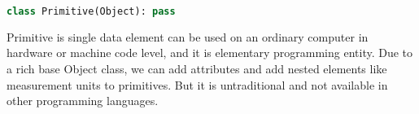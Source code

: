 \secdown

\begin{lstlisting}[language=Python]
class Primitive(Object): pass
\end{lstlisting}

\noindent
Primitive is single data element can be used on an ordinary computer in hardware
or machine code level, and it is elementary programming entity. Due to a rich
base Object class, we can add attributes and add nested elements like
measurement units to primitives. But it is untraditional and not available in
other programming languages.



\secup